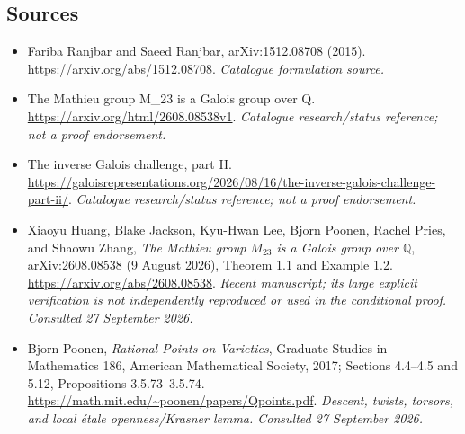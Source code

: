 \documentclass[11pt,a4paper]{article}
\newcommand{\Q}{\mathbb{Q}}
\numberwithin{equation}{section}
\begin{document}
\subsection{Sources}
\begin{itemize}\raggedright
\item[\textnormal{[S1]}]\hypertarget{source:statement:1}{} Fariba Ranjbar and Saeed Ranjbar, arXiv:1512.08708 (2015).
\url{https://arxiv.org/abs/1512.08708}.
{\small\textit{Catalogue formulation source.}}
\item[\textnormal{[S2]}]\hypertarget{source:statement:2}{} The Mathieu group M\_23 is a Galois group over Q.
\url{https://arxiv.org/html/2608.08538v1}.
{\small\textit{Catalogue research/status reference; not a proof endorsement.}}
\item[\textnormal{[S3]}]\hypertarget{source:statement:3}{} The inverse Galois challenge, part II.
\url{https://galoisrepresentations.org/2026/08/16/the-inverse-galois-challenge-part-ii/}.
{\small\textit{Catalogue research/status reference; not a proof endorsement.}}

\item[\textnormal{[E1]}]\hypertarget{extra:statement:1}{} Xiaoyu Huang, Blake Jackson, Kyu-Hwan Lee, Bjorn Poonen, Rachel Pries, and Shaowu Zhang, \emph{The Mathieu group $M_{23}$ is a Galois group over $\Q$}, arXiv:2608.08538 (9 August 2026), Theorem 1.1 and Example 1.2.
\url{https://arxiv.org/abs/2608.08538}.
{\small\textit{Recent manuscript; its large explicit verification is not independently reproduced or used in the conditional proof. Consulted 27 September 2026.}}
\item[\textnormal{[E2]}]\hypertarget{extra:statement:2}{} Bjorn Poonen, \emph{Rational Points on Varieties}, Graduate Studies in Mathematics 186, American Mathematical Society, 2017; Sections 4.4--4.5 and 5.12, Propositions 3.5.73--3.5.74.
\url{https://math.mit.edu/~poonen/papers/Qpoints.pdf}.
{\small\textit{Descent, twists, torsors, and local étale openness/Krasner lemma. Consulted 27 September 2026.}}
\end{itemize}
\end{document}
